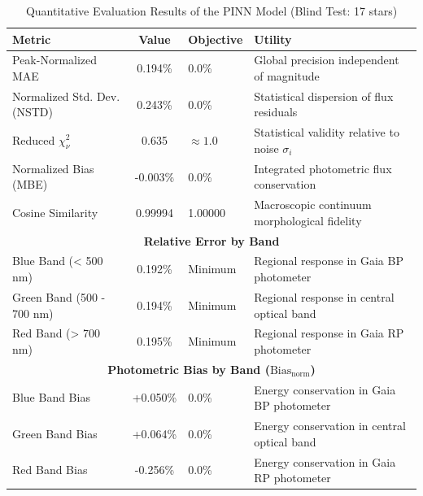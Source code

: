 
\begin{table}[htpb]
\centering
\caption{Quantitative Evaluation Results of the PINN Model (Blind Test: 17 stars)}
\label{tab:pinn_evaluation}
\begin{tabular}{lcll}
\hline
\textbf{Metric} & \textbf{Value} & \textbf{Objective} & \textbf{Utility} \\
\hline
Peak-Normalized MAE & 0.194\% & 0.0\% & Global precision independent of magnitude \\
Normalized Std. Dev. (NSTD) & 0.243\% & 0.0\% & Statistical dispersion of flux residuals \\
Reduced $\chi^2_\nu$ & 0.635 & $\approx 1.0$ & Statistical validity relative to noise $\sigma_i$ \\
Normalized Bias (MBE) & -0.003\% & 0.0\% & Integrated photometric flux conservation \\
Cosine Similarity & 0.99994 & 1.00000 & Macroscopic continuum morphological fidelity \\
\hline
\multicolumn{4}{c}{\textbf{Relative Error by Band}} \\
\hline
Blue Band (< 500 nm) & 0.192\% & Minimum & Regional response in Gaia BP photometer \\
Green Band (500 - 700 nm) & 0.194\% & Minimum & Regional response in central optical band \\
Red Band (> 700 nm) & 0.195\% & Minimum & Regional response in Gaia RP photometer \\
\hline
\multicolumn{4}{c}{\textbf{Photometric Bias by Band ($\text{Bias}_{\text{norm}}$)}} \\
\hline
Blue Band Bias & +0.050\% & 0.0\% & Energy conservation in Gaia BP photometer \\
Green Band Bias & +0.064\% & 0.0\% & Energy conservation in central optical band \\
Red Band Bias & -0.256\% & 0.0\% & Energy conservation in Gaia RP photometer \\
\hline
\end{tabular}
\end{table}
